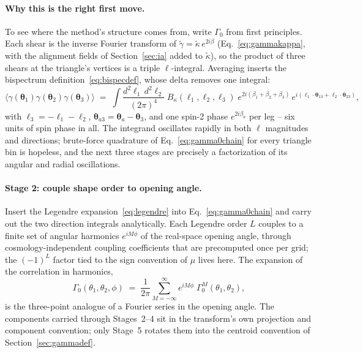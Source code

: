 \documentclass[11pt]{article}
\newcommand{\btheta}{\boldsymbol{\theta}}
\newcommand{\bell}{\boldsymbol{\ell}}
\numberwithin{equation}{section}
\begin{document}
\paragraph{Why this is the right first move.}
To see where the method's structure comes from, write
$\Gamma_0$ from first principles.  Each shear is the inverse Fourier
transform of $\tilde\gamma = \tilde\kappa\, e^{2i\beta}$
(Eq.~\eqref{eq:gammakappa}, with the alignment fields of
Section~\ref{sec:ia} added to $\tilde\kappa$), so the product of
three shears at the triangle's vertices is a triple
$\bell$-integral.  Averaging inserts the bispectrum
definition~\eqref{eq:bispecdef}, whose delta removes one integral:
\begin{equation}
  \bigl\langle \gamma(\btheta_1)\gamma(\btheta_2)\gamma(\btheta_3)
  \bigr\rangle
  \;=\;
  \int \frac{d^2\ell_1\, d^2\ell_2}{(2\pi)^4}\;
  B_\kappa(\bell_1, \bell_2, \bell_3)\;
  e^{2i(\beta_1 + \beta_2 + \beta_3)}\,
  e^{i(\bell_1\cdot\btheta_{13} + \bell_2\cdot\btheta_{23})} ,
  \label{eq:gamma0chain}
\end{equation}
with $\bell_3 = -\bell_1 - \bell_2$,
$\btheta_{a3} = \btheta_a - \btheta_3$, and one spin-2 phase
$e^{2i\beta_a}$ per leg -- six units of spin phase in all.  The
integrand oscillates rapidly in both $\bell$ magnitudes and
directions; brute-force quadrature of
Eq.~\eqref{eq:gamma0chain} for every triangle bin is hopeless, and
the next three stages are precisely a factorization of its angular
and radial oscillations.

\paragraph{Stage 2: couple shape order to opening angle.}
Insert the Legendre expansion~\eqref{eq:legendre} into
Eq.~\eqref{eq:gamma0chain} and carry out the two direction
integrals analytically.  Each Legendre order $L$ couples to a
finite set of angular harmonics $e^{iM\phi}$ of the real-space
opening angle, through cosmology-independent coupling coefficients
that are precomputed once per grid; the $(-1)^L$ factor tied to the
sign convention of $\mu$ lives here.  The expansion of the
correlation in harmonics,
\begin{equation}
  \Gamma_0(\theta_1, \theta_2, \phi)
  \;=\; \frac{1}{2\pi}
  \sum_{M=-\infty}^{\infty} e^{iM\phi}\;
  \Gamma_0^{M}(\theta_1, \theta_2) ,
  \label{eq:msum}
\end{equation}
is the three-point analogue of a Fourier series in the opening
angle.  The components carried through
Stages~2--4 sit in the transform's own projection and component
convention; only Stage~5 rotates them into the centroid convention
of Section~\ref{sec:gammadef}.
\end{document}
